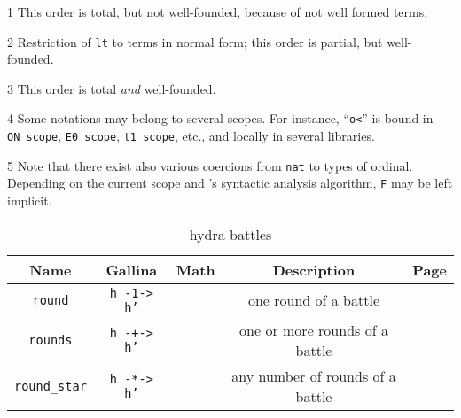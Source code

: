 \documentclass[a4paper]{book}
\begin{document}
\begin{table}[H]
\begin{threeparttable}
\begin{tabular}{|r | c|c|c|c|l|}
\hline
\end{tabular}
\begin{tablenotes}
  \item[1] This order is total, but not well-founded, because of not well formed terms.
\item[2] Restriction of \texttt{lt} to terms in normal form; this order is partial, but well-founded.
\item[3] This order is total \emph{and} well-founded.
\item [4]
Some notations may belong to several scopes. For instance, ``\texttt{o<}'' is
bound in \texttt{ON\_scope}, \texttt{E0\_scope}, \texttt{t1\_scope}, etc., and locally in several libraries.
  \item [5] Note that there exist also various coercions from \texttt{nat} to types of ordinal. Depending on the current scope and  \coq's syntactic analysis algorithm, \texttt{F} may be left implicit.
\end{tablenotes}
\end{threeparttable}
\end{table}



\vspace{4pt}


\begin{table}[H]

  \begin{threeparttable}
    \caption{hydra battles}
\begin{tabular}{|c|c|c|c|l|}
\hline
Name & Gallina&Math& Description& Page \\\hline
\texttt{round} & \texttt{h -1-> h'} & & one round of a battle & \pageref{sect:infix-round} \\
\texttt{rounds} & \texttt{h -+-> h'} & & one or more  rounds of a battle & \pageref{sect:infix-rounds} \\
\texttt{round\_star} & \texttt{h -*-> h'} & & any number of rounds of a battle & \pageref{sect:infix-rounds} \\
\hline
\end{tabular}


  \end{threeparttable}
 
\end{table}
\end{document}
